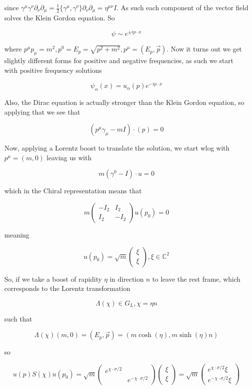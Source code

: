 \documentclass{article}
\theoremstyle{definition}
\begin{document}
since $\gamma^\mu \gamma^\nu \partial_\nu \partial_\mu = \frac{1}{2}
\{\gamma^\mu, \gamma^\nu\} \partial_\nu \partial_\mu = \eta^{\mu \nu} I$. As
such each component of the vector field solves the Klein Gordon equation.
So

$$ \psi \sim e^{\pm i p \cdot x} $$

where $p^\mu p_\mu = m^2, p^0 = E_p = \sqrt{p^2 + m^2}, p^\mu = (E_p,
\vec{p})$. Now it turns out we get slightly different forms for positive and
negative frequencies, as such we start with positive frequency solutions

$$ \psi_\alpha(x) = u_\alpha(p) e^{-i p \cdot x} $$

Also, the Dirac equation is actually stronger than the Klein Gordon equation, so
applying that we see that

$$ (p^\mu \gamma_\mu - mI) \cdot (p) = 0 $$

Now, applying a Lorentz boost to translate the solution, we start wlog with
$p^\mu = (m, 0)$ leaving us with

$$ m(\gamma^0 - I) \cdot u = 0 $$

which in the Chiral representation means that

$$ m
\begin{pmatrix}
  -I_2 & I_2 \\
  I_2 & -I_2
\end{pmatrix}
u(p_0) = 0 $$

meaning

$$ u(p_0) = \sqrt{m}
\begin{pmatrix}
  \xi \\
  \xi
\end{pmatrix}
, \xi \in \mathbb{C}^2 $$

So, if we take a boost of rapidity $\eta$ in direction $n$ to leave the rest
frame, which corresponds to the Lorentz transformation

$$ \Lambda(\chi) \in G_L, \chi = \eta n $$

such that

$$ \Lambda(\chi) (m, 0) = (E_p, \vec{p}) = (m \cosh(\eta), m \sinh(\eta) n) $$

so

$$ u(p) S(\chi) u(p_0) = \sqrt{m}
\begin{pmatrix}
  e^{\chi \cdot \sigma / 2} & \\
  & e^{-\chi \cdot \sigma / 2}
\end{pmatrix}
\begin{pmatrix}
  \xi \\
  \xi
\end{pmatrix} = \sqrt{m}
\begin{pmatrix}
  e^{\chi \cdot \sigma / 2} \xi \\
  e^{-\chi \cdot \sigma / 2} \xi
\end{pmatrix}
$$
\end{document}
